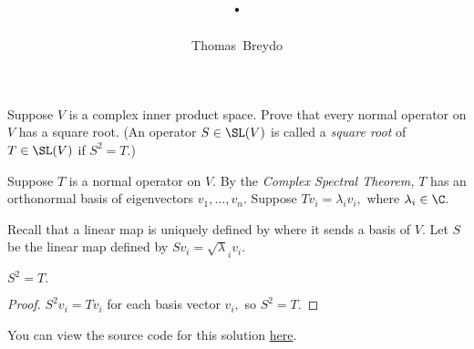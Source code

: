 \documentclass{amsart}
\title{\pagenum.\probnum}
\author{Thomas\ Breydo}
\newcommand{\pagenum}{223}
\newcommand{\probnum}{9}
\begin{document}
\maketitle

\begin{problem*}
Suppose $V$ is a complex inner product space. Prove
that every normal operator on $V$ has a square root.
(An operator $S\in\SL(V)$ is called a \textit{square root}
of $T\in\SL(V)$ if $S^2=T.$)
\end{problem*}

\vspace{0.5in}

Suppose $T$ is a normal operator on $V.$ By the
\textit{Complex Spectral Theorem,} $T$ has
an orthonormal basis of eigenvectors $v_1,\dots,v_n.$
Suppose $Tv_i=\lambda_iv_i,$ where $\lambda_i\in\C.$

Recall that a linear map is uniquely defined by where
it sends a basis of $V.$ Let $S$ be the linear map defined by
$Sv_i=\sqrt\lambda_iv_i.$
\begin{claim*}
$S^2=T.$
\end{claim*}
\begin{proof}
$S^2v_i=Tv_i$ for each basis vector $v_i,$ so $S^2=T.$
\end{proof}

\vspace{0.5in}

\begin{note*}
You can view the source code for this solution
\href{https://github.com/thomasbreydo/linalg/blob/main/\pagenum_\probnum_Thomas_Breydo.tex}
{here}.
\end{note*}
\end{document}
